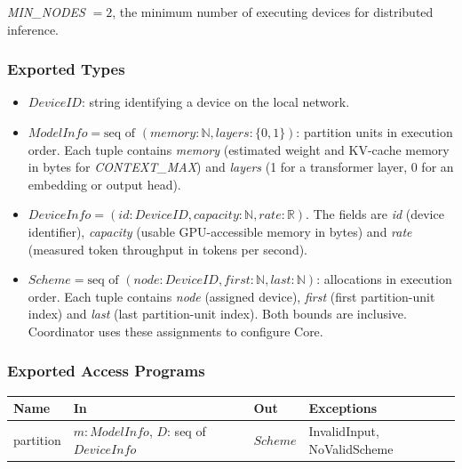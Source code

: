 \documentclass[12pt, titlepage]{article}
\begin{document}
\textit{MIN\_NODES} $=2$, the minimum number of executing devices for distributed
inference.

\subsubsection{Exported Types}

\begin{itemize}
\item $\mathit{DeviceID}$: string identifying a device on the local network.
\item $\mathit{ModelInfo} = \text{seq of } (\mathit{memory}:\mathbb{N},
  \mathit{layers}:\{0,1\})$: partition units in execution order.
  Each tuple contains \textit{memory}
  (estimated weight and KV-cache memory in bytes for \textit{CONTEXT\_MAX})
  and \textit{layers} (1 for a transformer layer, 0 for an embedding
  or output head).
\item $\mathit{DeviceInfo} = (\mathit{id}:\mathit{DeviceID},
  \mathit{capacity}:\mathbb{N},\mathit{rate}:\mathbb{R})$.
  The fields are \textit{id} (device identifier), \textit{capacity} (usable
  GPU-accessible memory in bytes) and \textit{rate} (measured token throughput
  in tokens per second).
\item $\mathit{Scheme} = \text{seq of } (\mathit{node}:\mathit{DeviceID},
  \mathit{first}:\mathbb{N},\mathit{last}:\mathbb{N})$: allocations in execution
  order. Each tuple contains \textit{node} (assigned device),
  \textit{first} (first partition-unit index) and
  \textit{last} (last partition-unit index). Both bounds are
  inclusive. Coordinator uses these assignments to configure Core.
\end{itemize}

\subsubsection{Exported Access Programs}

\begin{center}
\small
\begin{tabularx}{\textwidth}{@{}l>{\raggedright\arraybackslash}Xl>{\raggedright\arraybackslash}p{3.2cm}@{}}
\toprule
\textbf{Name} & \textbf{In} & \textbf{Out} & \textbf{Exceptions}\\
\midrule
partition & $m:\mathit{ModelInfo}$, $D$: seq of $\mathit{DeviceInfo}$ &
$\mathit{Scheme}$ & InvalidInput, NoValidScheme\\
\bottomrule
\end{tabularx}
\end{center}
\end{document}
